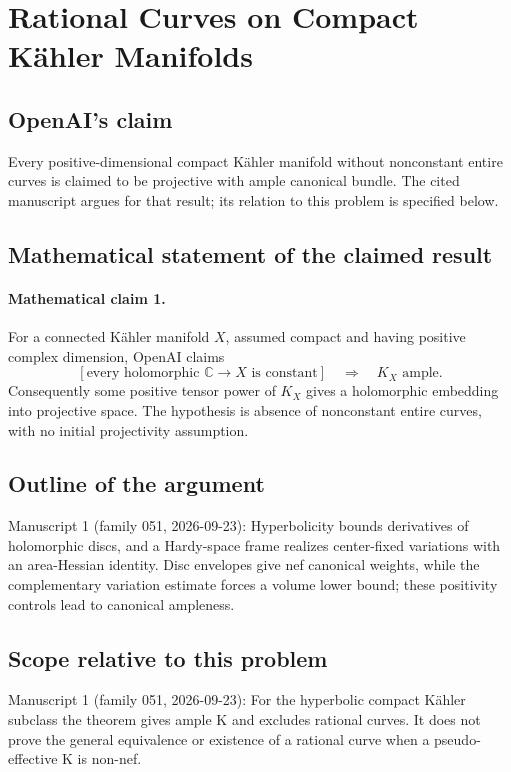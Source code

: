\documentclass[11pt]{article}
\begin{document}
\section*{Rational Curves on Compact Kähler Manifolds}

\subsection{OpenAI's claim}
Every positive-dimensional compact Kähler manifold without nonconstant entire curves is claimed to be projective with ample canonical bundle. The cited manuscript argues for that result; its relation to this problem is specified below.

\subsection{Mathematical statement of the claimed result}
\paragraph{Mathematical claim 1.} For a connected Kähler manifold $X$, assumed compact and having positive complex dimension, OpenAI claims
\[
[\text{every holomorphic }\mathbb C\to X\text{ is constant}]\quad\Longrightarrow\quad K_X\text{ ample}.
\]
Consequently some positive tensor power of $K_X$ gives a holomorphic embedding into projective space. The hypothesis is absence of nonconstant entire curves, with no initial projectivity assumption.

\subsection{Outline of the argument}
Manuscript 1 (family 051, 2026-09-23): Hyperbolicity bounds derivatives of holomorphic discs, and a Hardy-space frame realizes center-fixed variations with an area-Hessian identity. Disc envelopes give nef canonical weights, while the complementary variation estimate forces a volume lower bound; these positivity controls lead to canonical ampleness.

\subsection{Scope relative to this problem}
Manuscript 1 (family 051, 2026-09-23): For the hyperbolic compact Kähler subclass the theorem gives ample K and excludes rational curves. It does not prove the general equivalence or existence of a rational curve when a pseudo-effective K is non-nef.
\end{document}
